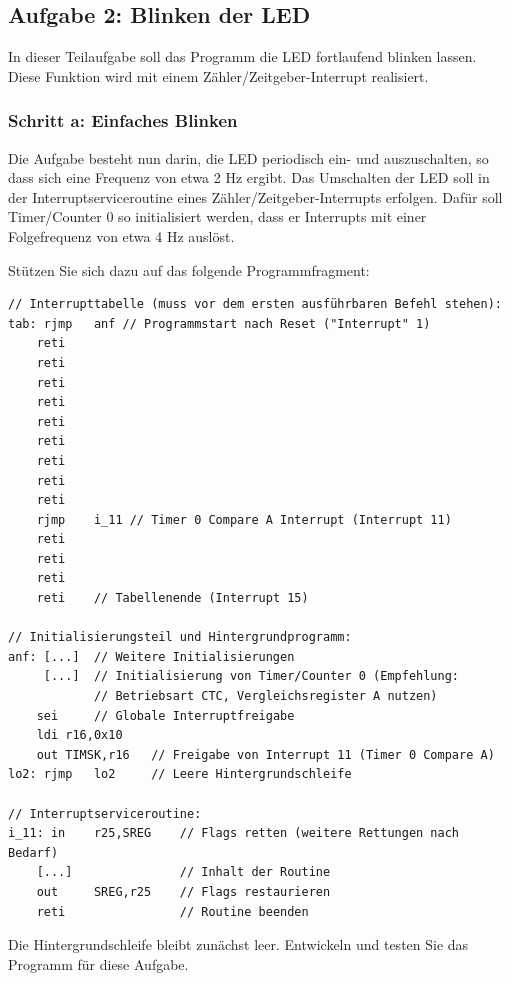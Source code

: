 \documentclass[a4paper,12pt,titlepage]{scrartcl}
\begin{document}
\subsection*{Aufgabe 2: Blinken der LED}
In dieser Teilaufgabe soll das Programm die LED fortlaufend blinken lassen. Diese Funktion wird mit einem Zähler/Zeitgeber-Interrupt realisiert.

\subsubsection*{Schritt a: Einfaches Blinken}
Die Aufgabe besteht nun darin, die LED periodisch ein- und auszuschalten, so dass sich eine Frequenz von etwa 2 Hz ergibt. Das Umschalten der LED soll in der Interruptserviceroutine eines Zähler/Zeitgeber-Interrupts erfolgen. Dafür soll Timer/Counter 0 so initialisiert werden, dass er Interrupts mit einer Folgefrequenz von etwa 4 Hz auslöst.

Stützen Sie sich dazu auf das folgende Programmfragment:
\begin{lstlisting}[basicstyle=\tiny]
// Interrupttabelle (muss vor dem ersten ausführbaren Befehl stehen):
tab: rjmp   anf // Programmstart nach Reset ("Interrupt" 1)
    reti
    reti
    reti
    reti
    reti
    reti
    reti
    reti
    reti
    rjmp    i_11 // Timer 0 Compare A Interrupt (Interrupt 11)
    reti
    reti
    reti
    reti    // Tabellenende (Interrupt 15)

// Initialisierungsteil und Hintergrundprogramm:
anf: [...]  // Weitere Initialisierungen
     [...]  // Initialisierung von Timer/Counter 0 (Empfehlung:
            // Betriebsart CTC, Vergleichsregister A nutzen)
    sei     // Globale Interruptfreigabe
    ldi r16,0x10
    out TIMSK,r16   // Freigabe von Interrupt 11 (Timer 0 Compare A)
lo2: rjmp   lo2     // Leere Hintergrundschleife

// Interruptserviceroutine:
i_11: in    r25,SREG    // Flags retten (weitere Rettungen nach Bedarf)
    [...]               // Inhalt der Routine
    out     SREG,r25    // Flags restaurieren
    reti                // Routine beenden
\end{lstlisting}

Die Hintergrundschleife bleibt zunächst leer. Entwickeln und testen Sie das Programm für diese Aufgabe.
\end{document}
